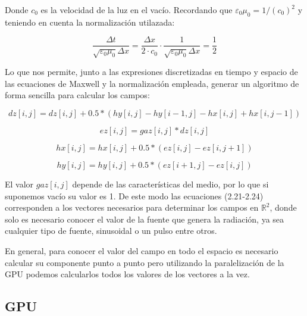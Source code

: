 \documentclass[11pt,a4paper,twoside,pdf]{article}
\numberwithin{equation}{section}
\begin{document}
Donde $c_{0}$ es la velocidad de la luz en el vacío. Recordando que $\varepsilon_{0} \mu_{0}=1/(c_{0})^2$ y teniendo en cuenta la normalización utilazada:

\begin{equation}
    \frac{\Delta t}{\sqrt{\varepsilon_{0} \mu_{0}} \Delta x}=\frac{\Delta x}{2 \cdot c_{0}}\cdot 
     \frac{1}{\sqrt{\varepsilon_{0} \mu_{0}} \Delta x}=\frac{1}{2}
\end{equation}

Lo que nos permite, junto a las expresiones discretizadas en tiempo y espacio de las ecuaciones de Maxwell y la normalización empleada, generar un algoritmo de forma sencilla para calcular los campos:

\begin{equation}
dz[i,j]=dz[i,j] + 0.5*(hy[i,j]-hy[i-1,j]-hx[i,j]+hx[i,j-1])
\end{equation}

\begin{equation}
    ez[i,j]=gaz[i,j]*dz[i,j]
\end{equation}

\begin{equation}
    hx[i,j]=hx[i,j]+0.5*(ez[i,j]-ez[i,j+1])
\end{equation}

\begin{equation}
    hy[i,j]=hy[i,j]+0.5*(ez[i+1,j]-ez[i,j])
\end{equation}

El valor $gaz[i,j]$ depende de las características del medio, por lo que si suponemos vacío su valor es 1. De este modo las ecuaciones (2.21-2.24) corresponden a los vectores necesarios para determinar los campos en $\mathbb R^{2}$, donde solo es necesario conocer el valor de la fuente que genera la radiación, ya sea cualquier tipo de fuente, sinusoidal o un pulso entre otros. 

En general, para conocer el valor del campo en todo el espacio es necesario calcular  su componente punto a punto pero utilizando la paralelización de la GPU podemos calcularlos todos los valores de los vectores a la vez.

\newpage

\subsection{GPU}
\end{document}
